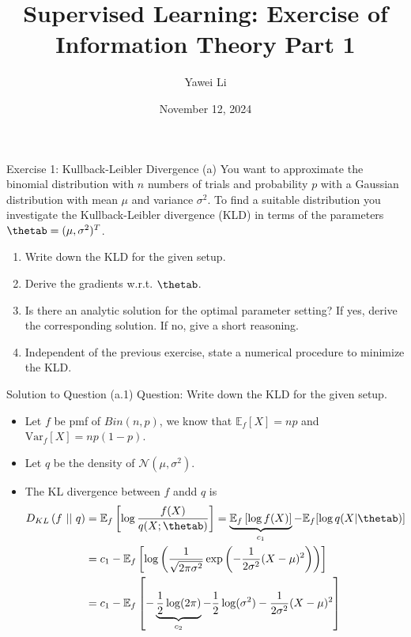 \documentclass[aspectratio=169]{beamer}
\title[]{\textbf{Supervised Learning: Exercise of \\ Information Theory Part 1}}
\author{Yawei Li}
\institute[LMU]
{
\\
  \texttt{yawei.li@stat.uni-muenchen.de}
}
\date{November 12, 2024}
\newcommand{\kld}[1]{D_{KL}\left(#1\right)}
\newcommand{\Ef}{\mathbb{E}_f}
\newcommand{\Varf}{\mathrm{Var}_f}
\begin{document}
\begin{frame}
\titlepage

\end{frame}


\begin{frame}{Exercise 1: Kullback-Leibler Divergence}
	(a) You want to approximate the binomial distribution with $n$ numbers of trials and probability $p$ with a Gaussian distribution with mean $\mu$ and variance $\sigma^2$. To find a suitable distribution you investigate the Kullback-Leibler divergence (KLD) in terms of the parameters $\thetab = (\mu, \sigma^2)^T$.
	\begin{enumerate}
		\item Write down the KLD for the given setup.
		\item Derive the gradients w.r.t. $\thetab$.
		\item Is there an analytic solution for the optimal parameter setting? If yes, derive the corresponding solution. If no, give a short reasoning.
		\item Independent of the previous exercise, state a numerical procedure to minimize the KLD.
	\end{enumerate}
\end{frame}

\begin{frame}{Solution to Question (a.1)}
	\small
	Question: Write down the KLD for the given setup.
	
	\begin{itemize}
		\item Let $f$ be pmf of $Bin(n, p)$, we know that $\Ef[X] = np$ and $\Varf[X] = np (1 - p)$.
		\item<2-> Let $q$ be the density of $\mathcal{N}(\mu, \sigma^2)$.
		\item<3-> The KL divergence between $f$ andd $q$ is
		\begin{align*}
			\kld{f \ || \ q} 
			&= \Ef \left[ \log \frac{f(X)}{q(X; \thetab)} \right] = \underbrace{\Ef \left[ \log f(X) \right]}_{c_1} - \Ef [\log q(X|\thetab)] \\
			&= c_1 - \Ef \left[ \log \left( \frac{1}{\sqrt{2 \pi \sigma^2}} \exp \left( - \frac{1}{2\sigma^2} (X - \mu)^2 \right)  \right) \right] \\
			&= c_1 - \Ef \left[ - \underbrace{\frac{1}{2} \log(2\pi)}_{c_2} - \frac{1}{2} \log (\sigma^2) - \frac{1}{2\sigma^2} (X - \mu)^2 \right]
		\end{align*}
	\end{itemize}
	
\end{frame}
\end{document}
